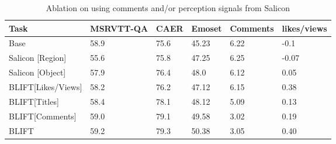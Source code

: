 \begin{table}[]
\centering
\begin{adjustbox}{width=\textwidth}
\begin{tabular}{l|lllll}
\toprule[1.2pt]
\textbf{Task}  & \textbf{MSRVTT-QA} & \textbf{CAER} & \textbf{Emoset} & \textbf{Comments} & \textbf{likes/views}\\ \midrule[1.2pt]
Base & 58.9 & 75.6 & 45.23 & 6.22 & -0.1\\
Salicon [Region] & 55.6 & 75.8 & 47.25 & 6.25 & -0.07\\
Salicon [Object] & 57.9 & 76.4 & 48.0 & 6.12 & 0.05\\
BLIFT[Likes/Views] & 58.2 & 76.2 & 47.12 & 6.15 & 0.38\\
BLIFT[Titles] & 58.4 & 78.1 & 48.12 & 5.09 & 0.13\\
BLIFT[Comments] & 59.0 & 79.1 & 49.58 & 3.02 & 0.19\\
BLIFT & 59.2 & 79.3 &50.38 & 3.05 & 0.40\\

\bottomrule[1.2pt]
\end{tabular}
\end{adjustbox}
\caption{Ablation on using comments and/or perception signals from Salicon \label{tab:salicon-ablation}}
\end{table}

